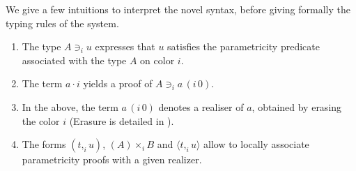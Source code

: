 \documentclass[english]{PaperTools/latex/lipics}
\newcommand\CP[3]{(#2,_{#1} #3)}
\newcommand\CTimes[2]{(#2) ×_{#1}}
\newcommand\param[1]{\!\cdot\!#1}
\newcommand\op[1]{∋_{#1}}
\newcommand\fp[3]{⟨#2 ,_{#1} #3⟩}
\newcommand\mor[2]{({#1}\,{#2})}
\newcommand\proj[2]{{#2}\,\mor{#1}0}
\begin{document}
We give a few intuitions to interpret the novel syntax, before giving formally the typing rules of the system. 
\begin{enumerate}
\item The type $A \op i u$ expresses that $u$ satisfies the
  parametricity predicate associated with the type $A$ on color $i$.
\item The term $a \param i$ yields a proof of $A \op i \proj i a$.
\item In the above, the term $\proj i a$ denotes a realiser of $a$,
  obtained by erasing the color $i$ (Erasure is detailed in
  ).
\item The forms $\CP i t u$, $\CTimes i A B$ and $\fp i t u$ allow to
  locally associate parametricity proofs with a given realizer.
\end{enumerate}
\end{document}
